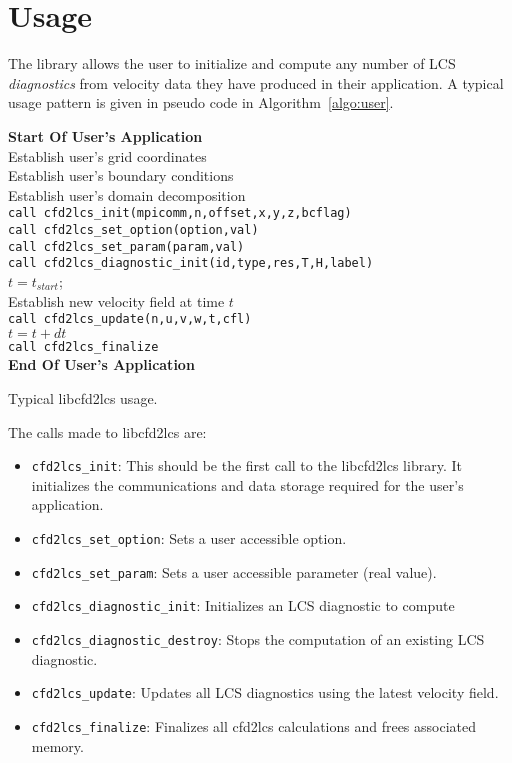 \documentclass[letterpaper,11pt]{article}
\begin{document}
\section{Usage}
The library allows the user to initialize and compute any number of LCS \emph{diagnostics} from velocity data they have produced in their application.  A typical usage pattern is given in pseudo code in Algorithm~\ref{algo:user}.
\begin{algorithm}[!htbp!]
\DontPrintSemicolon 
{\bf Start Of User's Application}\\
Establish user's grid coordinates \\
Establish user's boundary conditions\\
Establish user's domain decomposition\\
\verb|call cfd2lcs_init(mpicomm,n,offset,x,y,z,bcflag)|\\
\verb|call cfd2lcs_set_option(option,val)| \\
\verb|call cfd2lcs_set_param(param,val)| \\ 
\verb|call cfd2lcs_diagnostic_init(id,type,res,T,H,label)| \\
$t=t_{start}$;\\
 {
Establish new velocity field at time $t$\\
\texttt{call cfd2lcs\_update(n,u,v,w,t,cfl)}\\

$t = t+dt$\\
}
\verb|call cfd2lcs_finalize| \\
{\bf End Of User's Application}
\caption{Typical libcfd2lcs usage.}
\label{algo:user}
\end{algorithm}

The calls made to libcfd2lcs are:
\begin{itemize}
 \item \verb|cfd2lcs_init|:  This should be the first call to the libcfd2lcs library.  It initializes the communications and data storage required for the user's application.
 \item \verb|cfd2lcs_set_option|: Sets a user accessible option.
 \item \verb|cfd2lcs_set_param|: Sets a user accessible parameter (real value).
 \item \verb|cfd2lcs_diagnostic_init|:  Initializes an LCS diagnostic to compute
 \item \verb|cfd2lcs_diagnostic_destroy|:  Stops the computation of an existing LCS diagnostic.
 \item \verb|cfd2lcs_update|:  Updates all LCS diagnostics using the latest velocity field.
 \item \verb|cfd2lcs_finalize|:  Finalizes all cfd2lcs calculations and frees associated memory.
\end{itemize}
\end{document}
